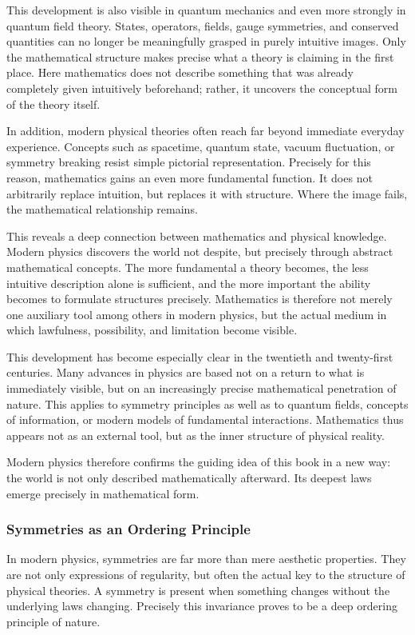 This development is also visible in quantum mechanics
and even more strongly in quantum field theory.
States,
operators,
fields,
gauge symmetries,
and conserved quantities
can no longer be meaningfully grasped in purely intuitive images.
Only the mathematical structure makes precise
what a theory is claiming in the first place.
Here mathematics does not describe something
that was already completely given intuitively beforehand;
rather, it uncovers the conceptual form of the theory itself.

In addition, modern physical theories often reach far beyond immediate everyday experience.
Concepts such as spacetime,
quantum state,
vacuum fluctuation,
or symmetry breaking
resist simple pictorial representation.
Precisely for this reason,
mathematics gains an even more fundamental function.
It does not arbitrarily replace intuition,
but replaces it with structure.
Where the image fails,
the mathematical relationship remains.

This reveals a deep connection between mathematics and physical knowledge.
Modern physics discovers the world not despite,
but precisely through abstract mathematical concepts.
The more fundamental a theory becomes,
the less intuitive description alone is sufficient,
and the more important the ability becomes
to formulate structures precisely.
Mathematics is therefore not merely one auxiliary tool among others in modern physics,
but the actual medium
in which lawfulness,
possibility,
and limitation become visible.

This development has become especially clear
in the twentieth and twenty-first centuries.
Many advances in physics are based not on a return
to what is immediately visible,
but on an increasingly precise mathematical penetration of nature.
This applies to symmetry principles
as well as to quantum fields,
concepts of information,
or modern models of fundamental interactions.
Mathematics thus appears not as an external tool,
but as the inner structure of physical reality.

Modern physics therefore confirms the guiding idea of this book in a new way:
the world is not only described mathematically afterward.
Its deepest laws emerge precisely in mathematical form.

\subsubsection{Symmetries as an Ordering Principle}

In modern physics, symmetries are far more than mere aesthetic properties.
They are not only expressions of regularity,
but often the actual key
to the structure of physical theories.
A symmetry is present
when something changes
without the underlying laws changing.
Precisely this invariance proves to be
a deep ordering principle of nature.

